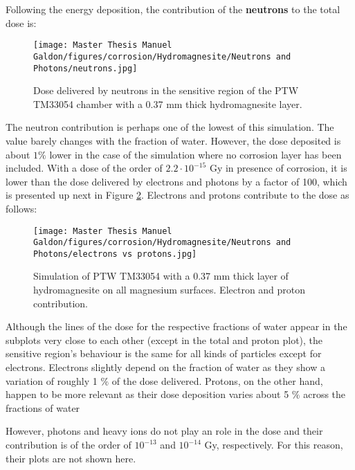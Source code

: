 Following the energy deposition, the contribution of the \textbf{neutrons} to the total dose is:
\begin{figure}[!h]
  \centering
  \texttt{[image: Master Thesis Manuel Galdon/figures/corrosion/Hydromagnesite/Neutrons and Photons/neutrons.jpg]}
  \caption{Dose delivered by neutrons in the sensitive region of the PTW TM33054 chamber with a 0.37 \unit{\milli\meter} thick hydromagnesite layer.}
  \label{fig:PTW-33053 with hydromagnesite. Neutron dose deposition}
\end{figure}

The neutron contribution is perhaps one of the lowest of this simulation. The value barely changes with the fraction of water. However, the dose deposited is about $1\%$ lower in the case of the simulation where no corrosion layer has been included. With a dose of the order of $2.2 \cdot 10^{-15}$ \unit{\gray} in presence of corrosion, it is lower than the dose delivered by electrons and photons by a factor of 100, which is presented up next in Figure \ref{fig:IC3305 with hydromagnesite, MEDAPP, electron and proton contribution. Full MEDAPP}. 
\clearpage
Electrons and protons contribute to the dose as follows: 

\begin{figure}[!h]
  \centering
    \centerline{\texttt{[image: Master Thesis Manuel Galdon/figures/corrosion/Hydromagnesite/Neutrons and Photons/electrons vs protons.jpg]}}
  \caption{Simulation of PTW TM33054 with a 0.37 \unit{\milli\meter} thick layer of hydromagnesite on all magnesium surfaces. Electron and proton contribution.}
  \label{fig:IC3305 with hydromagnesite, MEDAPP, electron and proton contribution. Full MEDAPP}
\end{figure}


Although the lines of the dose for the respective fractions of water appear in the subplots very close to each other (except in the total and proton plot), the sensitive region's behaviour is the same for all kinds of particles except for electrons.
Electrons slightly depend on the fraction of water as they show a variation of roughly 1 $\%$ of the dose delivered. Protons, on the other hand, happen to be more relevant as their dose deposition varies about 5 $\%$ across the fractions of water

However, photons and heavy ions do not play an role in the dose and their contribution is of the order of $10^{-13}$ and $10^{-14}$ \unit{\gray}, respectively. For this reason, their plots are not shown here.

